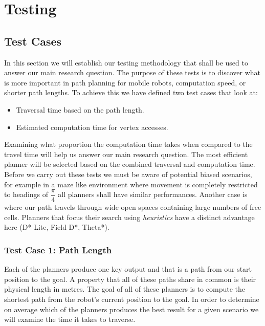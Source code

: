\chapter{Testing}


\section{Test Cases}

\noindent
In this section we will establish our testing methodology that shall be used to answer our main research question. The purpose of these tests is to discover what is more important in path planning for mobile robots, computation speed, or shorter path lengths. To achieve this we have defined two test cases that look at: 

\begin{itemize}
\item Traversal time based on the path length.
\item Estimated computation time for vertex accesses.
\end{itemize}

\noindent
Examining what proportion the computation time takes when compared to the travel time will help us answer our main research question. The most efficient planner will be selected based on the combined traversal and computation time. Before we carry out these tests we must be aware of potential biased scenarios, for example in a maze like environment where movement is completely restricted to headings of $\dfrac{\pi}{4}$ all planners shall have similar performances. Another case is where our path travels through wide open spaces containing large numbers of free cells. Planners that focus their search using \textit{heuristics} \cite{feurg paper} have a distinct advantage here (D* Lite, Field D*, Theta*). 

\newpage

\subsection{Test Case 1: Path Length}\label{test 1}

\noindent 
Each of the planners produce one key output and that is a path from our start position to the goal. A property that all of these paths share in common is their physical length in metres. The goal of all of these planners is to compute the shortest path from the robot's current position to the goal. In order to determine on average which of the planners produces the best result for a given scenario we will examine the time it takes to traverse. \\

